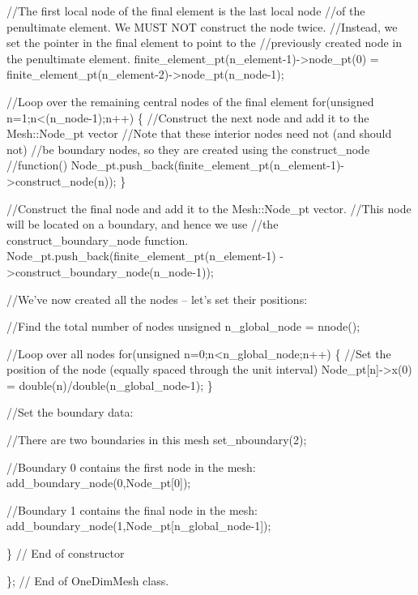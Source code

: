 \begin{DoxyCodeInclude}
  \textcolor{comment}{//The first local node of the final element is the last local node}
  \textcolor{comment}{//of the penultimate element. We MUST NOT construct the node twice.}
  \textcolor{comment}{//Instead, we set the pointer in the final element to point to the}
  \textcolor{comment}{//previously created node in the penultimate element.}
  finite\_element\_pt(n\_element-1)->node\_pt(0) = 
   finite\_element\_pt(n\_element-2)->node\_pt(n\_node-1);

  \textcolor{comment}{//Loop over the remaining central nodes of the final element}
  \textcolor{keywordflow}{for}(\textcolor{keywordtype}{unsigned} n=1;n<(n\_node-1);n++)
   \{
    \textcolor{comment}{//Construct the next node and add it to the Mesh::Node\_pt vector}
    \textcolor{comment}{//Note that these interior nodes need not (and should not)}
    \textcolor{comment}{//be boundary nodes, so they are created using the construct\_node}
    \textcolor{comment}{//function()}
    Node\_pt.push\_back(finite\_element\_pt(n\_element-1)->construct\_node(n));
   \}

  \textcolor{comment}{//Construct the final node and add it to the Mesh::Node\_pt vector.}
  \textcolor{comment}{//This node will be located on a boundary, and hence we use}
  \textcolor{comment}{//the construct\_boundary\_node function.}
  Node\_pt.push\_back(finite\_element\_pt(n\_element-1)
                    ->construct\_boundary\_node(n\_node-1));

  \textcolor{comment}{//We've now created all the nodes -- let's set their positions:}

  \textcolor{comment}{//Find the total number of nodes}
  \textcolor{keywordtype}{unsigned} n\_global\_node = nnode();

  \textcolor{comment}{//Loop over all nodes}
  \textcolor{keywordflow}{for}(\textcolor{keywordtype}{unsigned} n=0;n<n\_global\_node;n++)
   \{
    \textcolor{comment}{//Set the position of the node (equally spaced through the unit interval)}
    Node\_pt[n]->x(0) = double(n)/double(n\_global\_node-1);
   \}
 
  \textcolor{comment}{//Set the boundary data:}

  \textcolor{comment}{//There are two boundaries in this mesh}
  set\_nboundary(2);

  \textcolor{comment}{//Boundary 0 contains the first node in the mesh:}
  add\_boundary\_node(0,Node\_pt[0]);

  \textcolor{comment}{//Boundary 1 contains the final node in the mesh:}
  add\_boundary\_node(1,Node\_pt[n\_global\_node-1]); 

 \} \textcolor{comment}{// End of constructor}

\}; \textcolor{comment}{// End of OneDimMesh class.}

\end{DoxyCodeInclude}


